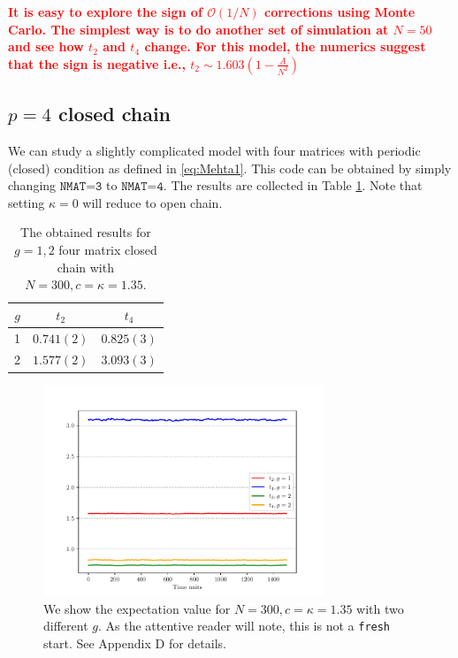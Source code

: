 \documentclass[11pt]{article}
\newcommand{\TODO}[1]{\textcolor{red}{{\bf #1}}}
\begin{document}
\TODO{It is easy to explore the sign of $\mathcal{O}(1/N)$ corrections using Monte Carlo. 
The simplest way is to do another set of simulation at $N=50$ and see how $t_{2}$ and 
$t_{4}$ change. For this model, the numerics suggest that the sign is negative
i.e., $t_{2} \sim 1.603(1 - \frac{A}{N^2})$} 

\subsection{$p=4$ closed chain} 

We can study a slightly complicated model with four matrices with periodic (closed) condition as defined in \ref{eq:Mehta1}.
This code can be obtained by simply changing $\texttt{NMAT=3}$ to  $\texttt{NMAT=4}$. 
The results are collected in Table \ref{table:4mchain_data}. Note that setting $\kappa=0$ will reduce to open chain.        


\begin{table}[h!]
	\centering
	\begin{tabular}{||c c c||} 
		\hline
		$g$ & $ t_2 $ & $t_4 $ \\ [0.5ex] 
		\hline\hline
		1 & $ 0.741(2)$ & $0.825(3) $  \\ 
		2 & $ 1.577(2) $ & $3.093(3)$
		 \\ [1ex] 
		\hline 
	\end{tabular}
\caption{The obtained results for $g=1,2$ four matrix closed chain with $N=300, c=\kappa=1.35$.}
\label{table:4mchain_data}
\end{table}


\begin{figure}[htbp] 
	\centering 
	\includegraphics[width=0.75\textwidth]{figs/4MM_g1_g2.pdf}
	\caption{\label{fig:4MM_closed1} We show the expectation value for $N=300, c=\kappa=1.35$ with two different $g$. As the attentive reader will note, this is not a \texttt{fresh} start. See Appendix D for details. }
\end{figure}
\end{document}
